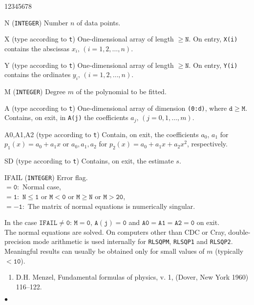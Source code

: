 \begin{DLtt}{12345678}
\item[N] ({\tt INTEGER}) Number $n$ of data points.
\item[X] (type according to {\tt t})
One-dimensional array of length $\mathtt{\ge N}$.
On entry, {\tt X(i)} contains the abscissas $x_i,\,(i=1,2,\ldots,n)$.
\item[Y] (type according to {\tt t})
One-dimensional array of length $\mathtt{\ge N}$.
On entry, {\tt Y(i)} contains the ordinates $y_i,\,(i=1,2,\ldots,n)$.
\item[M] ({\tt INTEGER}) Degree $m$ of the polynomial to be fitted.
\item[A] (type according to {\tt t}) One-dimensional array of
dimension {\tt (0:d)}, where $\mathtt{d \ge M}$. Contains, on exit,
in {\tt A(j)} the coefficients $a_j,\,(j = 0,1,\ldots,m)$.
\item[A0,A1,A2] (type according to {\tt t})
Contain, on exit, the coefficients
$a_0$, $a_1$ for $p_1(x)=a_0+a_1x$ or $a_0,a_1,a_2$ for
$p_2(x)=a_0+a_1x+a_2x^2$, respectively.
\item[SD] (type according to {\tt t}) Contains, on exit,
the estimate $s$.
\item[IFAIL] ({\tt INTEGER}) Error flag. \\
$\mathtt{= 0:}$ Normal case, \\
$\mathtt{= 1:}$ $\mathtt{N \le 1}$ or $\mathtt{M<0}$ or
$\mathtt{M \ge N}$ or $\mathtt{M>20}$, \\
$\mathtt{= -1:}$ The matrix of normal equations is numerically
singular.
\end{DLtt}
In the case $\mathtt{IFAIL \ne 0}$: $\mathtt{M=0}$,
$\mathtt{A(j)=0}$ and $\mathtt{A0=A1=A2=0}$ on exit. \\[3mm]
\newpage
\Method
The normal equations are solved. On computers other than CDC or Cray,
double-precision mode arithmetic is used internally for {\tt RLSQPM},
{\tt RLSQP1} and {\tt RLSQP2}.
\Notes
Meaningful results can usually be obtained only for small values
of $m$ (typically $\mathtt{<10}$).
\Refer
\begin{enumerate}
\item D.H. Menzel, Fundamental formulas of physics, v. 1,
(Dover, New York 1960) 116--122.
\end{enumerate}
$\bullet$
